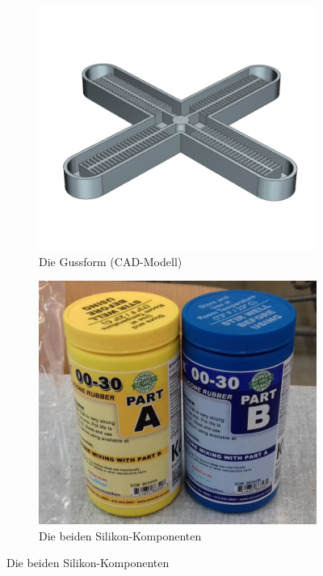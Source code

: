 \begin{figure}
    \begin{subfigure}{0.5\textwidth}
        \centering
        \includegraphics[width=0.9\linewidth]{pics/silikon-gussform.png}
        \caption{Die Gussform (CAD-Modell)}
        \label{fig:silikon-gussform}
    \end{subfigure}
    \begin{subfigure}{0.5\textwidth}
        \centering
        \includegraphics[width=0.9\linewidth]{pics/silikon-komponenten.jpg}
        \caption{Die beiden Silikon-Komponenten}
        \label{fig:silikon-komponenten}
    \end{subfigure}

\end{figure}
